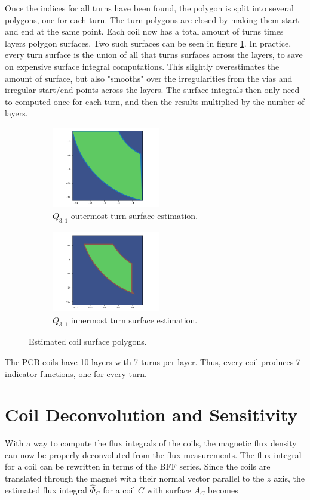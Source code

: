 Once the indices for all turns have been found, the polygon is
split into several polygons, one for each turn. The turn polygons
are closed by making them start and end at the same point. Each
coil now has a total amount of turns times layers polygon surfaces.
Two such surfaces can be seen in figure \ref{fig:coilsurfaces}.
In practice, every turn surface is the union of all that turns
surfaces across the layers, to save on expensive surface
integral computations. This slightly
overestimates the amount of surface, but also "smooths" over
the irregularities from the vias and irregular start/end points
across the layers. The surface integrals then only need to
computed once for each turn, and then the results multiplied
by the number of layers.

\begin{figure}[!h]
    \centering
    \begin{subfigure}[b]{0.4\textwidth}
        \centering
        \includegraphics[height=100pt]{figs/Q11-layer0}
        \caption{$Q_{3,1}$ outermost turn surface estimation.}
    \end{subfigure}
    \hfill
    \begin{subfigure}[b]{0.4\textwidth}
        \centering
        \includegraphics[height=100pt]{figs/Q11-layer5}
        \caption{$Q_{3,1}$ innermost turn surface estimation.}
    \end{subfigure}
    \caption{Estimated coil surface polygons.}
    \label{fig:coilsurfaces}
\end{figure}

The PCB coils have 10 layers with 7 turns per layer. Thus, every
coil produces 7 indicator functions, one for every turn.


\section{Coil Deconvolution and Sensitivity}
With a way to compute the flux integrals of the coils, the
magnetic flux density can now be properly deconvoluted
from the flux measurements. The flux integral for a
coil can be rewritten in terms of the BFF series.
Since the coils are translated through the magnet
with their normal vector parallel to the $z$ axis, the estimated
flux integral $\hat{\Phi}_C$
for a coil $C$ with surface $A_C$ becomes

